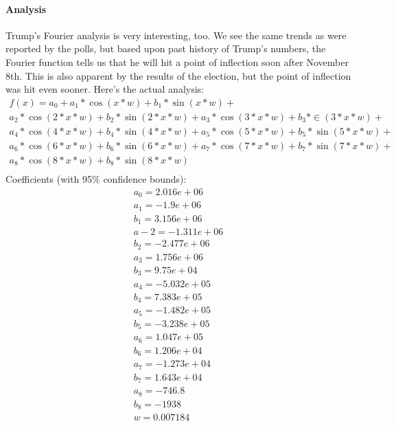 \documentclass[twoside]{article}
\begin{document}
              \paragraph{Analysis} Trump's Fourier analysis is very interesting, too. We see the same trends as were reported by the polls, but based upon past history of Trump's numbers,
              the Fourier function tells us that he will hit a point of inflection soon after November 8th. This is also apparent by the results of the election, but the point of inflection
              was hit even sooner. Here's the actual analysis:
              \newpage
              \begin{gather*}
                f(x) =
                a_0 + a_1*\cos(x*w) + b_1*\sin(x*w) +\\
                a_2*\cos(2*x*w) + b_2*\sin(2*x*w) + a_3*\cos(3*x*w) + b_3*\in(3*x*w) +\\
                a_4*\cos(4*x*w) + b_4*\sin(4*x*w) + a_5*\cos(5*x*w) + b_5*\sin(5*x*w) +\\
                a_6*\cos(6*x*w) + b_6*\sin(6*x*w) + a_7*\cos(7*x*w) + b_7*\sin(7*x*w) +\\
                a_8*\cos(8*x*w) + b_8*\sin(8*x*w)\\
              \end{gather*}
              Coefficients (with 95\% confidence bounds):
              \begin{gather*}
                a_0 =   2.016e+06\\
                a_1 =    -1.9e+06  \\
                b_1 =   3.156e+06  \\
                a-2 =  -1.311e+06  \\
                b_2 =  -2.477e+06  \\
                a_3 =   1.756e+06  \\
                b_3 =    9.75e+04  \\
                a_4 =  -5.032e+05  \\
                b_4 =   7.383e+05  \\
                a_5 =  -1.482e+05  \\
                b_5 =  -3.238e+05  \\
                a_6 =   1.047e+05  \\
                b_6 =   1.206e+04  \\
                a_7 =  -1.273e+04  \\
                b_7 =   1.643e+04  \\
                a_8 =      -746.8  \\
                b_8 =       -1938  \\
                w =    0.007184 \\
              \end{gather*}
              \newpage
\end{document}
